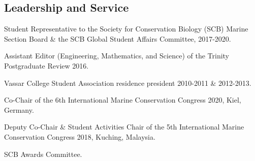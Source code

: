\documentclass[a4paper]{deedy-resume} %
\begin{document}
\begin{flushleft}
\sectionspace
\sectionspace


\section{Leadership and Service} 


\begin{tightitemize}
\item Student Representative to the Society for Conservation Biology (SCB) Marine Section Board \& the SCB Global Student Affairs Committee, 2017-2020. 
\item Assistant Editor (Engineering, Mathematics, and Science) of the Trinity Postgraduate Review 2016.
\item Vassar College Student Association residence president 2010-2011 \& 2012-2013.
\end{tightitemize}

\sectionspace
{}
\begin{tightitemize}
\item Co-Chair of the 6th International Marine Conservation Congress 2020, Kiel, Germany.
\item Deputy Co-Chair \& Student Activities Chair of the 5th International Marine Conservation Congress 2018, Kuching, Malaysia.
\item SCB Awards Committee.
\end{tightitemize}




\end{flushleft}



\newpage %


\sectionspace

\end{document}
